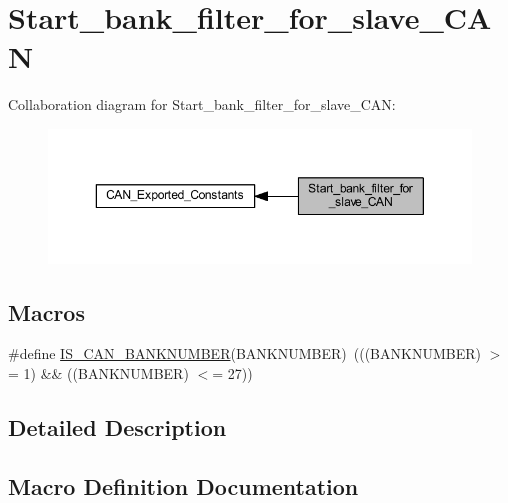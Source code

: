 \hypertarget{group___start__bank__filter__for__slave___c_a_n}{}\section{Start\+\_\+bank\+\_\+filter\+\_\+for\+\_\+slave\+\_\+\+C\+AN}
\label{group___start__bank__filter__for__slave___c_a_n}
Collaboration diagram for Start\+\_\+bank\+\_\+filter\+\_\+for\+\_\+slave\+\_\+\+C\+AN\+:
\nopagebreak
\begin{figure}[H]
\begin{center}
\leavevmode
\includegraphics[width=350pt]{group___start__bank__filter__for__slave___c_a_n}
\end{center}
\end{figure}
\subsection*{Macros}
\begin{DoxyCompactItemize}
\item 
\#define \hyperlink{group___start__bank__filter__for__slave___c_a_n_ga7fb463088ff4cd584bba47e3d0a4f469}{I\+S\+\_\+\+C\+A\+N\+\_\+\+B\+A\+N\+K\+N\+U\+M\+B\+ER}(B\+A\+N\+K\+N\+U\+M\+B\+ER)~(((B\+A\+N\+K\+N\+U\+M\+B\+ER) $>$= 1) \&\& ((B\+A\+N\+K\+N\+U\+M\+B\+ER) $<$= 27))
\end{DoxyCompactItemize}


\subsection{Detailed Description}


\subsection{Macro Definition Documentation}
\mbox{\label{group___start__bank__filter__for__slave___c_a_n_ga7fb463088ff4cd584bba47e3d0a4f469}} 
